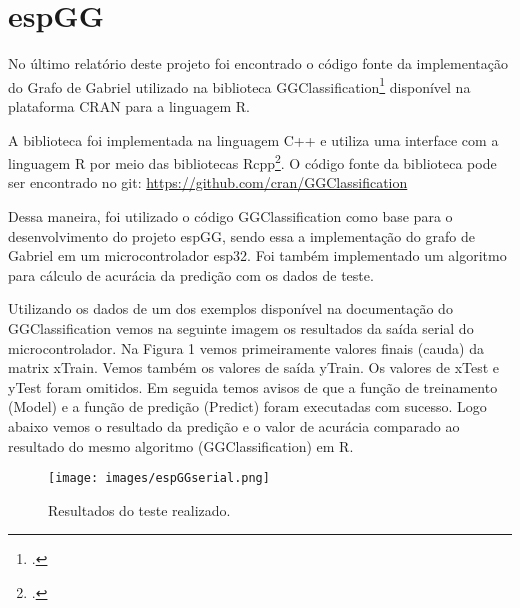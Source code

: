 \section{espGG}

No último relatório deste projeto foi encontrado o código fonte da implementação do Grafo de Gabriel
utilizado na biblioteca GGClassification\footcite{https://CRAN.R-project.org/package=GGClassification}
disponível na plataforma CRAN\cite*{CRAN} para a linguagem R\cite*{Rlanguage}. 

A biblioteca foi implementada na linguagem C++ e utiliza uma interface com a linguagem R por meio das bibliotecas Rcpp\footcite{https://github.com/RcppCore/Rcpp}.
O código fonte da biblioteca pode ser encontrado no git:
\url{https://github.com/cran/GGClassification}

Dessa maneira, foi utilizado o código GGClassification como base para o desenvolvimento do projeto espGG, sendo essa a implementação do grafo de Gabriel em um microcontrolador esp32.
Foi também implementado um algoritmo para cálculo de acurácia da predição com os dados de teste.

Utilizando os dados de um dos exemplos disponível na documentação do GGClassification vemos na seguinte imagem os resultados da saída serial do microcontrolador.
Na Figura 1 vemos primeiramente valores finais (cauda) da matrix xTrain. Vemos também os valores de saída yTrain. Os valores de xTest e yTest foram omitidos. 
Em seguida temos avisos de que a função de treinamento (Model) e a função de predição (Predict) foram executadas com sucesso. Logo abaixo vemos o resultado da predição e o valor de acurácia comparado
ao resultado do mesmo algoritmo (GGClassification) em R. 

\begin{figure}[h!]
    \centering
    \label{fig1}
    \texttt{[image: images/espGGserial.png]}
    \caption{Resultados do teste realizado.}
\end{figure}


